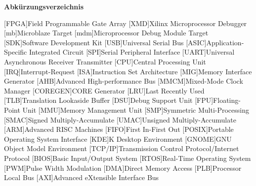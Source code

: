 
{\textbf{Abkürzungsverzeichnis}}

\begin{acronym}[Bash]
 [FPGA]{Field Programmable Gate Array}
 [XMD]{Xilinx Microprocessor Debugger}
 [mb]{Microblaze Target}
 [mdm]{Microprocessor Debug Module Target}
 [SDK]{Software Development Kit}
 [USB]{Universal Serial Bus}
 [ASIC]{Application-Specific Integrated Circuit}
 [SPI]{Serial Peripheral Interface}
 [UART]{Universal Asynchronous Receiver Transmitter}
 [CPU]{Central Processing Unit}
 [IRQ]{Interrupt-Request}
 [ISA]{Instruction Set Architecture}
 [MIG]{Memory Interface Generator}
 [AHB]{Advanced High-performance Bus}
 [MMCM]{Mixed-Mode Clock Manager}
 [COREGEN]{CORE Generator}
  [LRU]{Last Recently Used}
  [TLB]{Translation Lookaside Buffer}
  [DSU]{Debug Support Unit}
  [FPU]{Floating-Point Unit}
 [MMU]{Memory Management Unit}
  [SMP]{Symmetric Multi-Processing}
 [SMAC]{Signed Multiply-Accumulate}
  [UMAC]{Unsigned Multiply-Accumulate}
 [ARM]{Advanced RISC Machines}
 [FIFO]{First In-First Out}
 [POSIX]{Portable Operating System Interface}
 [KDE]{K Desktop Environment}
 [GNOME]{GNU Object Model Environment}
  [TCP/IP]{Transmission Control Protocol/Internet Protocol}
[BIOS]{Basic Input/Output System}
 [RTOS]{Real-Time Operating System}
 [PWM]{Pulse Width Modulation}
  [DMA]{Direct Memory Access}
 [PLB]{Processor Local Bus}
 [AXI]{Advanced eXtensible Interface Bus}

\end{acronym}
